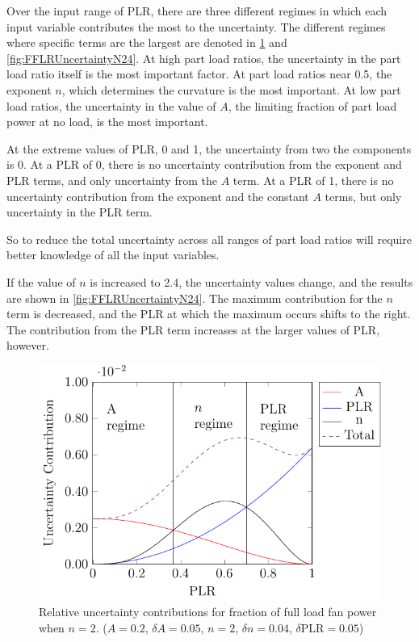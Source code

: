 Over the input range of PLR, there are three different regimes in which
each input variable contributes the most to the uncertainty. The
different regimes where specific terms are the largest are denoted in
\figref{} \ref{fig:FFLRUncertainty} and \ref{fig:FFLRUncertaintyN24}. At high
part load ratios, the uncertainty in the part load ratio itself is the
most important factor. At part load ratios near 0.5, the exponent \(n\),
which determines the curvature is the most important. At low part load
ratios, the uncertainty in the value of \(A\), the limiting fraction of
part load power at no load, is the most important.

At the extreme values of PLR, 0 and 1, the uncertainty from two the
components is 0. At a PLR of 0, there is no uncertainty contribution
from the exponent and PLR terms, and only uncertainty from the \(A\) term. At
a PLR of 1, there is no uncertainty contribution from the exponent and
the constant \(A\) terms, but only uncertainty in the PLR term. 

So to reduce the total uncertainty across all ranges of part load ratios
will require better knowledge of all the input variables.

If the value of \(n\) is increased to 2.4, the uncertainty values
change, and the results are shown in \figref{}
\ref{fig:FFLRUncertaintyN24}. The maximum contribution for the \(n\)
term is decreased, and the PLR at which the maximum occurs shifts to the
right. The contribution from the PLR term increases at the larger values
of PLR, however.

\begin{figure}
\centering
\includegraphics{Plots/2017-05-15-FFLPUncertainty.pdf}
\caption{Relative uncertainty contributions for fraction of full load
fan power when \(n=2\). (\(A=0.2\), \(\delta A = 0.05\), \(n=2\), \(\delta n =0.04\), \(\delta \text{PLR}=0.05\))}
\label{fig:FFLRUncertainty}
\end{figure}

